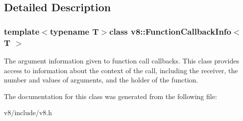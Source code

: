 \subsection{Detailed Description}
\subsubsection*{template$<$typename T$>$class v8\-::\-Function\-Callback\-Info$<$ T $>$}

The argument information given to function call callbacks. This class provides access to information about the context of the call, including the receiver, the number and values of arguments, and the holder of the function. 

The documentation for this class was generated from the following file\-:\begin{DoxyCompactItemize}
\item 
v8/include/v8.\-h\end{DoxyCompactItemize}

